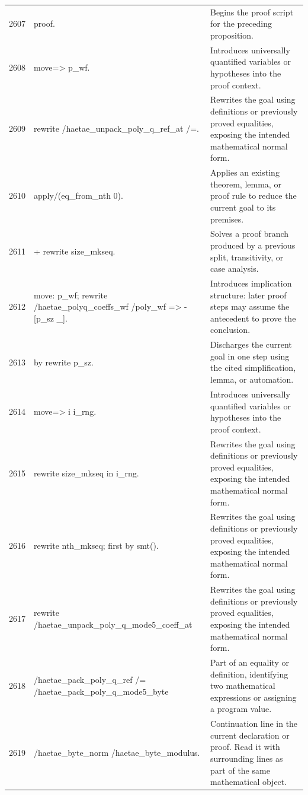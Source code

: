 \documentclass[10pt]{article}
\begin{document}
\begin{longtable}{r L{0.53\textwidth} L{0.37\textwidth}}
2607 & {\ttfamily\scriptsize proof.} & Begins the proof script for the preceding proposition. \\
2608 & {\ttfamily\scriptsize move=> p\_wf.} & Introduces universally quantified variables or hypotheses into the proof context. \\
2609 & {\ttfamily\scriptsize rewrite /haetae\_unpack\_poly\_q\_ref\_at /=.} & Rewrites the goal using definitions or previously proved equalities, exposing the intended mathematical normal form. \\
2610 & {\ttfamily\scriptsize apply/(eq\_from\_nth 0).} & Applies an existing theorem, lemma, or proof rule to reduce the current goal to its premises. \\
2611 & {\ttfamily\scriptsize + rewrite size\_mkseq.} & Solves a proof branch produced by a previous split, transitivity, or case analysis. \\
2612 & {\ttfamily\scriptsize   move: p\_wf; rewrite /haetae\_polyq\_coeffs\_wf /poly\_wf => -[p\_sz \_].} & Introduces implication structure: later proof steps may assume the antecedent to prove the conclusion. \\
2613 & {\ttfamily\scriptsize   by rewrite p\_sz.} & Discharges the current goal in one step using the cited simplification, lemma, or automation. \\
2614 & {\ttfamily\scriptsize move=> i i\_rng.} & Introduces universally quantified variables or hypotheses into the proof context. \\
2615 & {\ttfamily\scriptsize rewrite size\_mkseq in i\_rng.} & Rewrites the goal using definitions or previously proved equalities, exposing the intended mathematical normal form. \\
2616 & {\ttfamily\scriptsize rewrite nth\_mkseq; first by smt().} & Rewrites the goal using definitions or previously proved equalities, exposing the intended mathematical normal form. \\
2617 & {\ttfamily\scriptsize rewrite /haetae\_unpack\_poly\_q\_mode5\_coeff\_at} & Rewrites the goal using definitions or previously proved equalities, exposing the intended mathematical normal form. \\
2618 & {\ttfamily\scriptsize         /haetae\_pack\_poly\_q\_ref /= /haetae\_pack\_poly\_q\_mode5\_byte} & Part of an equality or definition, identifying two mathematical expressions or assigning a program value. \\
2619 & {\ttfamily\scriptsize         /haetae\_byte\_norm /haetae\_byte\_modulus.} & Continuation line in the current declaration or proof.  Read it with surrounding lines as part of the same mathematical object. \\

\end{longtable}
\end{document}
